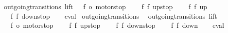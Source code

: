\begin{isabellebody}
\ \ {\isachardoublequoteopen}outgoing{\isacharunderscore}transitions\ lift\ {}\ {\isacharequal}\ {\isacharbraceleft}{\isacharbar}{\isacharparenleft}{\isacharparenleft}f{}{\isacharcomma}\ o{}{\isacharparenright}{\isacharcomma}\ motorstop{}{\isacharparenright}{\isacharcomma}\isanewline
\ \ \ \ {\isacharparenleft}{\isacharparenleft}f{}{\isacharcomma}\ f{}{\isacharparenright}{\isacharcomma}\ up{}{}stop{\isacharparenright}{\isacharcomma}\isanewline
\ \ \ \ {\isacharparenleft}{\isacharparenleft}f{}{\isacharcomma}\ f{}{\isacharparenright}{\isacharcomma}\ up{}{}{\isacharparenright}{\isacharcomma}\isanewline
\ \ \ \ {\isacharparenleft}{\isacharparenleft}f{}{\isacharcomma}\ f{}{\isacharparenright}{\isacharcomma}\ down{}{}stop{\isacharparenright}{\isacharbar}{\isacharbraceright}{\isachardoublequoteclose}\isanewline
%
\isadelimproof
\ \ %
\endisadelimproof
%
\isatagproof
{}\isamarkupfalse%
\ eval%
\endisatagproof
{\isafoldproof}%
%
\isadelimproof
\isanewline
%
\endisadelimproof
\isanewline
{}\isamarkupfalse%
\ outgoing{\isacharunderscore}transitions{\isacharunderscore}{}{\isacharcolon}\isanewline
\ \ {\isachardoublequoteopen}outgoing{\isacharunderscore}transitions\ lift\ {}\ {\isacharequal}\ {\isacharbraceleft}{\isacharbar}\isanewline
\ \ \ \ {\isacharparenleft}{\isacharparenleft}f{}{\isacharcomma}\ o{}{\isacharparenright}{\isacharcomma}\ motorstop{}{\isacharparenright}{\isacharcomma}\isanewline
\ \ \ \ {\isacharparenleft}{\isacharparenleft}f{}{\isacharcomma}\ f{}{\isacharparenright}{\isacharcomma}\ up{}{}stop{\isacharparenright}{\isacharcomma}\isanewline
\ \ \ \ {\isacharparenleft}{\isacharparenleft}f{}{\isacharcomma}\ f{}{\isacharparenright}{\isacharcomma}\ down{}{}stop{\isacharparenright}{\isacharcomma}\isanewline
\ \ \ \ {\isacharparenleft}{\isacharparenleft}f{}{\isacharcomma}\ f{}{\isacharparenright}{\isacharcomma}\ down{}{}{\isacharparenright}\isanewline
{\isacharbar}{\isacharbraceright}{\isachardoublequoteclose}\isanewline
%
\isadelimproof
\ \ %
\endisadelimproof
%
\isatagproof
{}\isamarkupfalse%
\ eval%
\endisatagproof
{\isafoldproof}%
%
\isadelimproof
\isanewline
%
\endisadelimproof
\isanewline
{}\isamarkupfalse%

\end{isabellebody}
